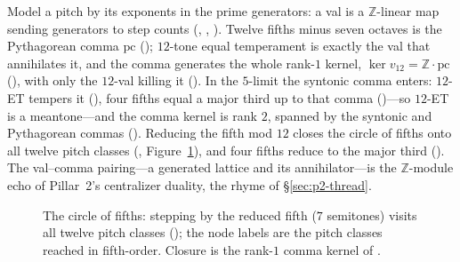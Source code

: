
Model a pitch by its exponents in the prime generators: a val is a $\mathbb{Z}$-linear map sending
generators to step counts (, , ). Twelve fifths minus seven octaves is
the Pythagorean comma $\mathrm{pc}$ (); $12$-tone equal temperament is
exactly the val that annihilates it, and the comma generates the whole rank-$1$ kernel,
$\ker v_{12}=\mathbb{Z}\cdot\mathrm{pc}$ (), with only the
$12$-val killing it (). In the $5$-limit the syntonic comma enters:
$12$-ET tempers it (), four fifths equal a major third up to that
comma ()---so $12$-ET is a meantone---and the comma kernel is
rank $2$, spanned by the syntonic and Pythagorean commas (). Reducing the
fifth mod $12$ closes the circle of fifths onto all twelve pitch classes
(, Figure~\ref{fig:p3-fifths}), and four fifths reduce to the
major third (). The val--comma pairing---a generated lattice and
its annihilator---is the $\mathbb{Z}$-module echo of Pillar~2's centralizer duality, the rhyme of
\S\ref{sec:p2-thread}.

\begin{figure}[ht]
\centering
{}
\caption{The circle of fifths: stepping by the reduced fifth ($7$ semitones) visits all twelve
pitch classes (); the node labels are the pitch classes reached
in fifth-order. Closure is the rank-$1$ comma kernel of .}
\label{fig:p3-fifths}
\end{figure}

